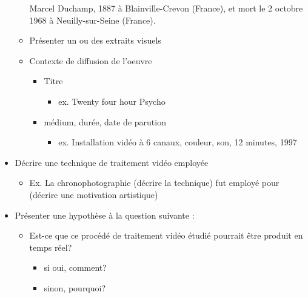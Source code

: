 \documentclass[
  french,
]{book}
\newenvironment{Shaded}{\begin{snugshade}}{\end{snugshade}}
\newcommand{\NormalTok}[1]{#1}
\providecommand{\tightlist}{%
  \setlength{\itemsep}{0pt}\setlength{\parskip}{0pt}}
\begin{document}
\begin{itemize}
\begin{itemize}
\begin{Shaded}
\begin{Highlighting}[]
\NormalTok{Marcel Duchamp, 1887 à Blainville{-}Crevon (France), et mort le 2 octobre 1968 à Neuilly{-}sur{-}Seine (France).}
\end{Highlighting}
\end{Shaded}
  \item
    Présenter un ou des extraits visuels
  \item
    Contexte de diffusion de l'oeuvre

    \begin{itemize}
    \tightlist
    \item
      Titre

      \begin{itemize}
      \tightlist
      \item
        ex. Twenty four hour Psycho
      \end{itemize}
    \item
      médium, durée, date de parution

      \begin{itemize}
      \tightlist
      \item
        ex. Installation vidéo à 6 canaux, couleur, son, 12 minutes, 1997
      \end{itemize}
    \end{itemize}
  \end{itemize}
\item
  Décrire une technique de traitement vidéo employée

  \begin{itemize}
  \tightlist
  \item
    Ex. La chronophotographie (décrire la technique) fut employé pour (décrire une motivation artistique)
  \end{itemize}
\item
  Présenter une hypothèse à la question suivante :

  \begin{itemize}
  \tightlist
  \item
    Est-ce que ce procédé de traitement vidéo étudié pourrait être produit en temps réel?

    \begin{itemize}
    \tightlist
    \item
      si oui, comment?
    \item
      sinon, pourquoi?
    \end{itemize}
  \end{itemize}
\end{itemize}
\end{document}
